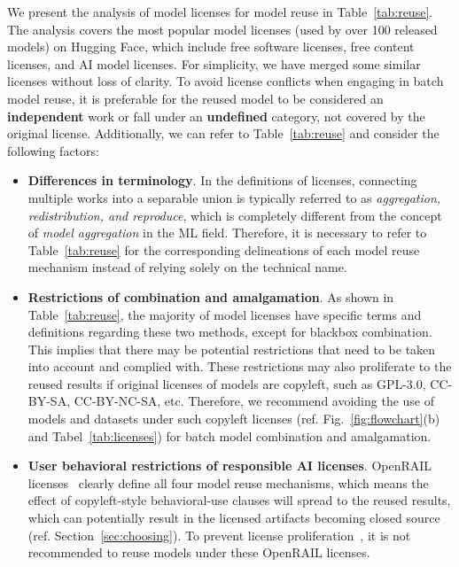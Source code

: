 We present the analysis of model licenses for model reuse in Table~\ref{tab:reuse}. 
The analysis covers the most popular model licenses (used by over 100 released models) on Hugging Face, which include free software licenses, free content licenses, and AI model licenses.
For simplicity, we have merged some similar licenses without loss of clarity.
To avoid license conflicts when engaging in batch model reuse, it is preferable for the reused model to be considered an \textbf{independent} work or fall under an \textbf{undefined} category, not covered by the original license.
Additionally, we can refer to Table~\ref{tab:reuse} and consider the following factors:
\begin{itemize}
  \item \textbf{Differences in terminology}. In the definitions of licenses, connecting multiple works into a separable union is typically referred to as \textit{aggregation, redistribution, and reproduce}, which is completely different from the concept of \textit{model aggregation} in the ML field. Therefore, it is necessary to refer to Table~\ref{tab:reuse} for the corresponding delineations of each model reuse mechanism instead of relying solely on the technical name.

  \item \textbf{Restrictions of combination and amalgamation}. As shown in Table~\ref{tab:reuse}, the majority of model licenses have specific terms and definitions regarding these two methods, except for blackbox combination. This implies that there may be potential restrictions that need to be taken into account and complied with.
  These restrictions may also proliferate to the reused results if original licenses of models are copyleft, such as GPL-3.0, CC-BY-SA, CC-BY-NC-SA, etc.
  Therefore, we recommend avoiding the use of models and datasets under such copyleft licenses (ref. Fig.~\ref{fig:flowchart}(b) and Tabel~\ref{tab:licenses}) for batch model combination and amalgamation.

  \item \textbf{User behavioral restrictions of responsible AI licenses}. OpenRAIL licenses~\cite{contractor2022behavioral} clearly define all four model reuse mechanisms, which means the effect of copyleft-style behavioral-use clauses will spread to the reused results, which can potentially result in the licensed artifacts becoming closed source~\cite{greenbaum2016the} (ref. Section~\ref{sec:choosing}).
  To prevent license proliferation~\cite{gomulkiewicz2009open}, it is not recommended to reuse models under these OpenRAIL licenses.
\end{itemize}

